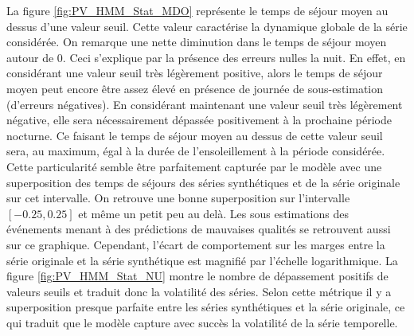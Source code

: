 \documentclass[12pt]{report}
\begin{document}
La figure \ref{fig:PV_HMM_Stat_MDO} représente le temps de séjour moyen au dessus d'une valeur seuil. Cette valeur caractérise la dynamique globale de la série considérée. On remarque une nette diminution dans le temps de séjour moyen autour de 0. Ceci s'explique par la présence des erreurs nulles la nuit. En effet, en considérant une valeur seuil très légèrement positive, alors le temps de séjour moyen peut encore être assez élevé en présence de journée de sous-estimation (d'erreurs négatives). En considérant maintenant une valeur seuil très légèrement négative, elle sera nécessairement dépassée positivement à la prochaine période nocturne. Ce faisant le temps de séjour moyen au dessus de cette valeur seuil sera, au maximum, égal à la durée de l'ensoleillement à la période considérée. Cette particularité semble être parfaitement capturée par le modèle avec une superposition des temps de séjours des séries synthétiques et de la série originale sur cet intervalle. On retrouve une bonne superposition sur l'intervalle $[-0.25,0.25]$ et même un petit peu au delà. Les sous estimations des événements menant à des prédictions de mauvaises qualités se retrouvent aussi sur ce graphique. Cependant, l'écart de comportement sur les marges entre la série originale et la série synthétique est magnifié par l'échelle logarithmique. La figure \ref{fig:PV_HMM_Stat_NU} montre le nombre de dépassement positifs de valeurs seuils et traduit donc la volatilité des séries. Selon cette métrique il y a superposition presque parfaite entre les séries synthétiques et la série originale, ce qui traduit que le modèle capture avec succès la volatilité de la série temporelle.
\end{document}
